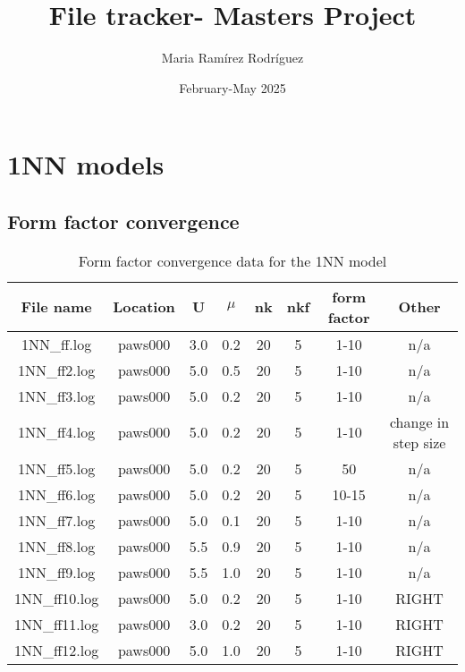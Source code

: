 \documentclass{article}
\title{File tracker- Masters Project}
\author{Maria Ramírez Rodríguez}
\date{February-May 2025}
\begin{document}
\maketitle

\section{1NN models}

\subsection{ Form factor convergence}

\begin{table}[h]
    \centering
    \begin{tabular}{|c|c|c|c|c|c|c|c|}
        \hline
        File name & Location & U & $\mu$ &  nk & nkf & form factor & Other \\ \hline
        1NN\_ff.log &  paws000 & 3.0 & 0.2 & 20 & 5 & 1-10 & n/a \\ \hline
        1NN\_ff2.log &  paws000 & 5.0 & 0.5 & 20 & 5 & 1-10 & n/a  \\ \hline
        1NN\_ff3.log &  paws000 & 5.0 & 0.2 & 20 & 5 & 1-10 & n/a  \\ \hline
        1NN\_ff4.log &  paws000 & 5.0 & 0.2 & 20 & 5 & 1-10 & change in step size \\ \hline
        1NN\_ff5.log &  paws000 & 5.0 & 0.2 & 20 & 5 & 50 & n/a  \\ \hline
        1NN\_ff6.log &  paws000 & 5.0 & 0.2 & 20 & 5 & 10-15 & n/a  \\ \hline
        1NN\_ff7.log &  paws000 & 5.0 & 0.1 & 20 & 5 & 1-10 & n/a  \\ \hline
        1NN\_ff8.log &  paws000 & 5.5 & 0.9 & 20 & 5 & 1-10 & n/a  \\ \hline
        1NN\_ff9.log &  paws000 & 5.5 & 1.0 & 20 & 5 & 1-10 & n/a  \\ \hline
        1NN\_ff10.log &  paws000 & 5.0 & 0.2 & 20 & 5 & 1-10 & RIGHT  \\ \hline
        1NN\_ff11.log &  paws000 & 3.0 & 0.2 & 20 & 5 & 1-10 & RIGHT  \\ \hline
        1NN\_ff12.log &  paws000 & 5.0 & 1.0 & 20 & 5 & 1-10 & RIGHT  \\ \hline
    \end{tabular}
    \caption{Form factor convergence data for the 1NN model}
    \label{tab:example_table}
\end{table}
\end{document}

